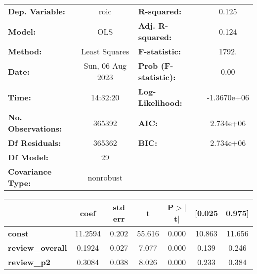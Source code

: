 \begin{center}
\begin{tabular}{lclc}
\toprule
\textbf{Dep. Variable:}                                               &       roic       & \textbf{  R-squared:         } &      0.125   \\
\textbf{Model:}                                                       &       OLS        & \textbf{  Adj. R-squared:    } &      0.124   \\
\textbf{Method:}                                                      &  Least Squares   & \textbf{  F-statistic:       } &      1792.   \\
\textbf{Date:}                                                        & Sun, 06 Aug 2023 & \textbf{  Prob (F-statistic):} &      0.00    \\
\textbf{Time:}                                                        &     14:32:20     & \textbf{  Log-Likelihood:    } & -1.3670e+06  \\
\textbf{No. Observations:}                                            &      365392      & \textbf{  AIC:               } &  2.734e+06   \\
\textbf{Df Residuals:}                                                &      365362      & \textbf{  BIC:               } &  2.734e+06   \\
\textbf{Df Model:}                                                    &          29      & \textbf{                     } &              \\
\textbf{Covariance Type:}                                             &    nonrobust     & \textbf{                     } &              \\
\bottomrule
\end{tabular}
\begin{tabular}{lcccccc}
                                                                      & \textbf{coef} & \textbf{std err} & \textbf{t} & \textbf{P$> |$t$|$} & \textbf{[0.025} & \textbf{0.975]}  \\
\midrule
\textbf{const}                                                        &      11.2594  &        0.202     &    55.616  &         0.000        &       10.863    &       11.656     \\
\textbf{review\_overall}                                              &       0.1924  &        0.027     &     7.077  &         0.000        &        0.139    &        0.246     \\
\textbf{review\_p2}                                                   &       0.3084  &        0.038     &     8.026  &         0.000        &        0.233    &        0.384     \\

\end{tabular}
\end{center}
